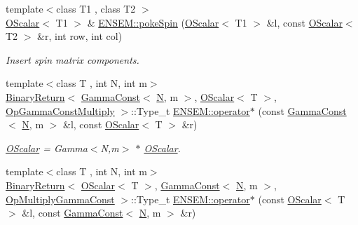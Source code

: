 \begin{DoxyCompactItemize}
{\footnotesize template$<$class T1 , class T2 $>$ }\\\mbox{\hyperlink{classENSEM_1_1OScalar}{O\+Scalar}}$<$ T1 $>$ \& \mbox{\hyperlink{group__obsscalar_gadabf69e63453311d92faee77643c2b7a}{E\+N\+S\+E\+M\+::poke\+Spin}} (\mbox{\hyperlink{classENSEM_1_1OScalar}{O\+Scalar}}$<$ T1 $>$ \&l, const \mbox{\hyperlink{classENSEM_1_1OScalar}{O\+Scalar}}$<$ T2 $>$ \&r, int row, int col)
\begin{DoxyCompactList}\small\item\em Insert spin matrix components. \end{DoxyCompactList}\item 
{\footnotesize template$<$class T , int N, int m$>$ }\\\mbox{\hyperlink{structENSEM_1_1BinaryReturn}{Binary\+Return}}$<$ \mbox{\hyperlink{classENSEM_1_1GammaConst}{Gamma\+Const}}$<$ \mbox{\hyperlink{adat__devel_2lib_2hadron_2operator__name__util_8cc_a7722c8ecbb62d99aee7ce68b1752f337}{N}}, m $>$, \mbox{\hyperlink{classENSEM_1_1OScalar}{O\+Scalar}}$<$ T $>$, \mbox{\hyperlink{structENSEM_1_1OpGammaConstMultiply}{Op\+Gamma\+Const\+Multiply}} $>$\+::Type\+\_\+t \mbox{\hyperlink{group__obsscalar_ga3db0be55f47b788fa0f005d8e7bcfbac}{E\+N\+S\+E\+M\+::operator$\ast$}} (const \mbox{\hyperlink{classENSEM_1_1GammaConst}{Gamma\+Const}}$<$ \mbox{\hyperlink{adat__devel_2lib_2hadron_2operator__name__util_8cc_a7722c8ecbb62d99aee7ce68b1752f337}{N}}, m $>$ \&l, const \mbox{\hyperlink{classENSEM_1_1OScalar}{O\+Scalar}}$<$ T $>$ \&r)
\begin{DoxyCompactList}\small\item\em \mbox{\hyperlink{classENSEM_1_1OScalar}{O\+Scalar}} = Gamma$<$\+N,m$>$ $\ast$ \mbox{\hyperlink{classENSEM_1_1OScalar}{O\+Scalar}}. \end{DoxyCompactList}\item 
{\footnotesize template$<$class T , int N, int m$>$ }\\\mbox{\hyperlink{structENSEM_1_1BinaryReturn}{Binary\+Return}}$<$ \mbox{\hyperlink{classENSEM_1_1OScalar}{O\+Scalar}}$<$ T $>$, \mbox{\hyperlink{classENSEM_1_1GammaConst}{Gamma\+Const}}$<$ \mbox{\hyperlink{adat__devel_2lib_2hadron_2operator__name__util_8cc_a7722c8ecbb62d99aee7ce68b1752f337}{N}}, m $>$, \mbox{\hyperlink{structENSEM_1_1OpMultiplyGammaConst}{Op\+Multiply\+Gamma\+Const}} $>$\+::Type\+\_\+t \mbox{\hyperlink{group__obsscalar_ga1a9ed6642b9c94843e7a8c143c2f0236}{E\+N\+S\+E\+M\+::operator$\ast$}} (const \mbox{\hyperlink{classENSEM_1_1OScalar}{O\+Scalar}}$<$ T $>$ \&l, const \mbox{\hyperlink{classENSEM_1_1GammaConst}{Gamma\+Const}}$<$ \mbox{\hyperlink{adat__devel_2lib_2hadron_2operator__name__util_8cc_a7722c8ecbb62d99aee7ce68b1752f337}{N}}, m $>$ \&r)

\end{DoxyCompactItemize}
